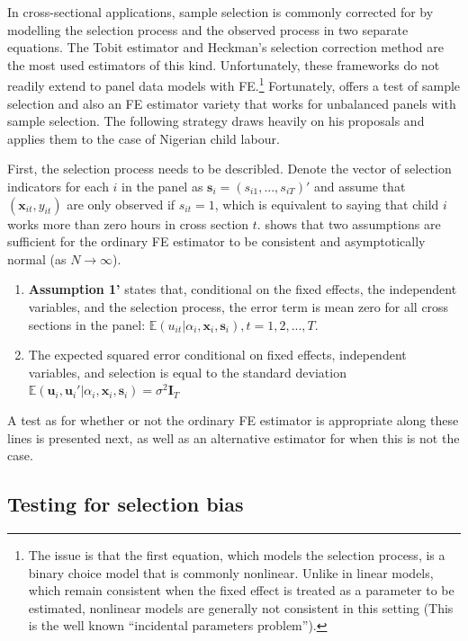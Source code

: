 \documentclass[a4paper,12pt]{article}
\theoremstyle{plain}
\theoremstyle{definition}
\theoremstyle{definition}
\theoremstyle{definition}
\theoremstyle{definition}
\begin{document}
In cross-sectional applications, sample selection is commonly corrected for by modelling the selection process and the observed process in two separate equations. The Tobit estimator \citep{tobin1958,amemiya1984} and Heckman's selection correction \citep{heckman1979} method are the most used estimators of this kind. Unfortunately, these frameworks do not readily extend to panel data models with FE.\footnote{The issue is that the first equation, which models the selection process, is a binary choice model that is commonly nonlinear. Unlike in linear models, which remain consistent when the fixed effect is treated as a parameter to be estimated, nonlinear models are generally not consistent in this setting (This is the well known ``incidental parameters problem'').} Fortunately, \citet {wooldridge1995, wooldridge2010} offers a test of sample selection and also an FE estimator variety that works for unbalanced panels with sample selection. The following strategy draws heavily on his proposals and applies them to the case of Nigerian child labour. 

First, the selection process needs to be describled. Denote the vector of selection indicators for each $i$ in the panel as $\mathbf{s}_i=(s_{i1},...,s_{iT})'$ and assume that $(\mathbf{x}_{it}, y_{it})$ are only observed if $s_{it} = 1$, which is equivalent to saying that child $i$ works more than zero hours in cross section $t$. \citet{wooldridge1995} shows that two assumptions are sufficient for the ordinary FE estimator to be consistent and asymptotically normal (as $N\rightarrow \infty$).
\begin{enumerate}
    \item \label{Assumption_1'}\textbf{Assumption 1'} \citep{wooldridge1995} states that, conditional on the fixed effects, the independent variables, and the selection process, the error term is mean zero for all cross sections in the panel: $\mathbb{E}(u_{it}|\alpha_i, \mathbf{x}_i, \mathbf{s}_i), t= 1,2,...,T.$       \item The expected squared error conditional on fixed effects, independent variables, and selection is equal to the standard deviation $\mathbb{E}(\mathbf{u}_i,\mathbf{u}_i'|\alpha_i, \mathbf{x}_i, \mathbf{s}_i)=\sigma^2 \mathbf{I}_T$
\end{enumerate}
A test as for whether or not the ordinary FE estimator is appropriate along these lines is presented next, as well as an alternative estimator for when this is not the case.

\subsection{Testing for selection bias}
\end{document}

